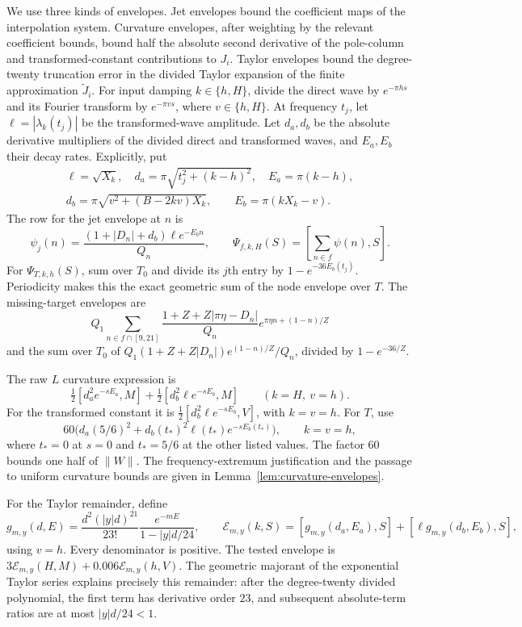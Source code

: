 \documentclass[11pt]{article}
\theoremstyle{remark}\newtheorem{remark}[theorem]{Remark}
\begin{document}
We use three kinds of envelopes. Jet envelopes bound the coefficient
maps of the interpolation system. Curvature envelopes, after weighting
by the relevant coefficient bounds, bound half the absolute second
derivative of the pole-column and transformed-constant contributions to
$J_i$. Taylor envelopes bound the degree-twenty truncation error in the
divided Taylor expansion of the finite approximation $\widetilde J_i$.
For input damping $k\in\{h,H\}$, divide the direct wave by
$e^{-\pi hs}$ and its Fourier transform by $e^{-\pi vs}$, where
$v\in\{h,H\}$. At frequency $t_j$, let $\ell=|\lambda_k(t_j)|$
be the transformed-wave amplitude. Let $d_a,d_b$ be the absolute derivative multipliers of the
divided direct and transformed waves, and $E_a,E_b$ their decay rates.
Explicitly, put
\[
 \begin{gathered}
 \ell=\sqrt{X_k},\quad d_a=\pi\sqrt{t_j^2+(k-h)^2},\quad E_a=\pi(k-h),\\
 d_b=\pi\sqrt{v^2+(B-2kv)X_k},\qquad E_b=\pi(kX_k-v).
 \end{gathered}
\]
The row for the jet envelope at $n$ is
\[
 \psi_j(n)=\frac{(1+|D_n|+d_b)\ell e^{-E_bn}}{Q_n},
 \qquad \Psi_{f,k,H}(S)=\left[\sum_{n\in f}\psi(n),S\right].
\]
For $\Psi_{T,k,h}(S)$, sum over $T_0$ and divide its $j$th entry
by $1-e^{-36E_b(t_j)}$. Periodicity makes this the exact geometric
sum of the node envelope over $T$.
The missing-target envelopes are
\[
 Q_1\sum_{n\in f\cap[9,21]}
 \frac{1+Z+Z|\pi\eta-D_n|}{Q_n}
 e^{\pi\eta n+(1-n)/Z}
\]
and the sum over $T_0$ of
$Q_1(1+Z+Z|D_n|)e^{(1-n)/Z}/Q_n$, divided by
$1-e^{-36/Z}$.

The raw $L$ curvature expression is
\[
 \tfrac12[d_a^2e^{-sE_a},M]
 +\tfrac12[d_b^2\ell e^{-sE_b},M]
 \qquad(k=H,\ v=h).
\]
For the transformed constant it is
$\tfrac12[d_b^2\ell e^{-sE_b},V]$, with $k=v=h$.
For $T$, use
\[
 60\bigl(d_a(5/6)^2+
 d_b(t_*)^2\ell(t_*)e^{-sE_b(t_*)}\bigr),
 \qquad k=v=h,
\]
where $t_*=0$ at $s=0$ and $t_*=5/6$ at the other listed values.
The factor $60$ bounds one half of $\|W\|$.
The frequency-extremum justification and the passage to uniform
curvature bounds are given in Lemma~\ref{lem:curvature-envelopes}.

For the Taylor remainder, define
\[
 g_{m,y}(d,E)=
 \frac{d^2(|y|d)^{21}}{23!}
 \frac{e^{-mE}}{1-|y|d/24},\qquad
 \mathcal E_{m,y}(k,S)
 =[g_{m,y}(d_a,E_a),S]+[\ell g_{m,y}(d_b,E_b),S],
\]
using $v=h$. Every denominator is positive. The tested envelope is
$3\mathcal E_{m,y}(H,M)+0.006\mathcal E_{m,y}(h,V)$.
The geometric majorant of the exponential Taylor series explains
precisely this remainder: after the degree-twenty divided polynomial,
the first term has derivative order $23$, and subsequent absolute-term
ratios are at most $|y|d/24<1$.
\end{document}
